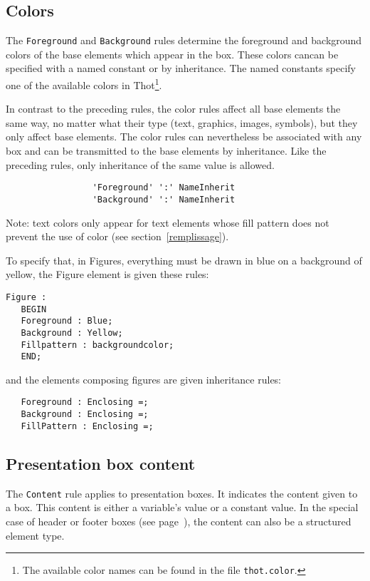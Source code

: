 \subsection{Colors}
\label{couleurs}

The {\tt Foreground} and {\tt Background} rules determine the
foreground and background colors of the base elements which appear in
the box.  These colors cancan be specified with a named constant or by
inheritance.  The named constants specify one of the available colors
in Thot\footnote{The available color names can be found in the file
{\tt thot.color}.}. 

In contrast to the preceding rules, the color rules affect all base
elements the same way, no matter what their type (text, graphics,
images, symbols), but they only affect base elements.  The color rules
can nevertheless be associated with any box and can be transmitted to
the base elements by inheritance.  Like the preceding rules, only
inheritance of the same value is allowed.

\begin{verbatim}
                 'Foreground' ':' NameInherit
                 'Background' ':' NameInherit
\end{verbatim}

Note: text colors only appear for text elements whose fill pattern
does not prevent the use of color (see section~\ref{remplissage}).

\begin{example}
To specify that, in Figures, everything must be drawn in blue on a
background of yellow, the Figure element is
given these rules:

\begin{verbatim}
Figure :
   BEGIN
   Foreground : Blue;
   Background : Yellow;
   Fillpattern : backgroundcolor;
   END;
\end{verbatim}
and the elements composing figures are given inheritance rules:
\begin{verbatim}
   Foreground : Enclosing =;
   Background : Enclosing =;
   FillPattern : Enclosing =;
\end{verbatim}
\end{example}

\subsection{Presentation box content}
\label{content}

The {\tt Content} rule applies to presentation boxes.  It indicates
the content given to a box.  This content is either a variable's value
or a constant value.  In the special case of header or footer boxes
(see page~\pageref{page}), the content can also be a structured
element type.

